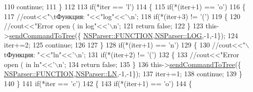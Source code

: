 \begin{DoxyCode}
110                         \textcolor{keywordflow}{continue};
111                 \}
112 
113                 \textcolor{keywordflow}{if}(*iter == \textcolor{charliteral}{'l'})
114                 \{
115                     \textcolor{keywordflow}{if}(*(iter+1) == \textcolor{charliteral}{'o'})
116                     \{
117                         \textcolor{comment}{//cout<<"\(\backslash\)tФункция: "<<"log"<<'\(\backslash\)n';}
118                         \textcolor{keywordflow}{if}(*(iter+3) != \textcolor{charliteral}{'('})
119                         \{
120                             \textcolor{comment}{//cout<<"Error open ( in log"<<'\(\backslash\)n';}
121                             \textcolor{keywordflow}{return} \textcolor{keyword}{false};
122                         \}
123                         this->\hyperlink{classParser_ac61a1fedefe50ed900f0e65c029053c1}{sendCommandToTree}(\{
      \hyperlink{namespaceNSParser_aca012df556c0413c6166348fdd62c4eba4adabba7d2f386bba54639075a582a36}{NSParser::FUNCTION},\hyperlink{namespaceNSParser_aae20df1402d72f463a1a9efe3ce1a9b9a9667a30f73605cf32db6c8c94ab528da}{NSParser::LOG},-1,-1\});
124                         iter+=2;
125                         \textcolor{keywordflow}{continue};
126 
127                     \}
128                     \textcolor{keywordflow}{if}(*(iter+1) == \textcolor{charliteral}{'n'})
129                     \{
130                         \textcolor{comment}{//cout<<"\(\backslash\)tФункция: "<<"ln"<<'\(\backslash\)n';}
131                         \textcolor{keywordflow}{if}(*(iter+2) != \textcolor{charliteral}{'('})
132                         \{
133                             \textcolor{comment}{//cout<<"Error open ( in ln"<<'\(\backslash\)n';}
134                             \textcolor{keywordflow}{return} \textcolor{keyword}{false};
135                         \}
136                         this->\hyperlink{classParser_ac61a1fedefe50ed900f0e65c029053c1}{sendCommandToTree}(\{
      \hyperlink{namespaceNSParser_aca012df556c0413c6166348fdd62c4eba4adabba7d2f386bba54639075a582a36}{NSParser::FUNCTION},\hyperlink{namespaceNSParser_aae20df1402d72f463a1a9efe3ce1a9b9aa1683bf9eb7c51325f4c14776cb1063b}{NSParser::LN},-1,-1\});
137                         iter+=1;
138                         \textcolor{keywordflow}{continue};
139                     \}
140                 \}
141                 \textcolor{keywordflow}{if}(*iter == \textcolor{charliteral}{'c'})
142                 \{
143                     \textcolor{keywordflow}{if}(*(iter+1) == \textcolor{charliteral}{'o'})
144                     \{

\end{DoxyCode}
